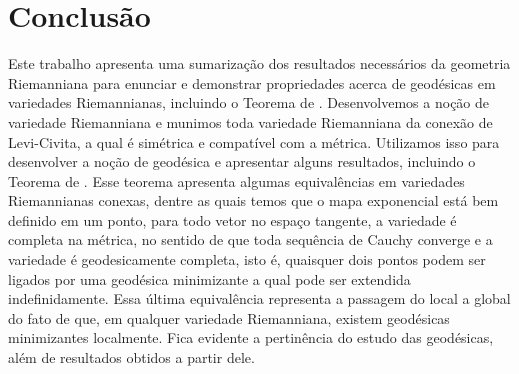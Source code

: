 \chapter{Conclusão}
\label{cap:conclusao}

Este trabalho apresenta uma sumarização dos resultados necessários da geometria Riemanniana para enunciar e demonstrar propriedades acerca de geodésicas em variedades Riemannianas, incluindo o Teorema de . Desenvolvemos a noção de variedade Riemanniana e munimos toda variedade Riemanniana da conexão de Levi-Civita, a qual é simétrica e compatível com a métrica. Utilizamos isso para desenvolver a noção de geodésica e apresentar alguns resultados, incluindo o Teorema de . Esse teorema apresenta algumas equivalências em variedades Riemannianas conexas, dentre as quais temos que o mapa exponencial está bem definido em um ponto, para todo vetor no espaço tangente, a variedade é completa na métrica, no sentido de que toda sequência de Cauchy converge e a variedade é geodesicamente completa, isto é, quaisquer dois pontos podem ser ligados por uma geodésica minimizante a qual pode ser extendida indefinidamente. Essa última equivalência representa a passagem do local a global do fato de que, em qualquer variedade Riemanniana, existem geodésicas minimizantes localmente. Fica evidente a pertinência do estudo das geodésicas, além de resultados obtidos a partir dele.
